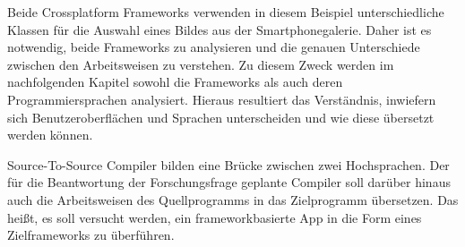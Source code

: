 



Beide Crossplatform Frameworks verwenden in diesem Beispiel unterschiedliche Klassen für die Auswahl eines Bildes aus der Smartphonegalerie.  Daher ist es notwendig,  beide Frameworks zu analysieren und die genauen Unterschiede zwischen den Arbeitsweisen zu verstehen.  Zu diesem Zweck werden im nachfolgenden Kapitel sowohl die Frameworks als auch deren Programmiersprachen analysiert.  Hieraus resultiert das Verständnis, inwiefern sich Benutzeroberflächen und Sprachen unterscheiden und wie diese übersetzt werden können.

Source-To-Source Compiler bilden eine Brücke zwischen zwei Hochsprachen.  Der für die Beantwortung der Forschungsfrage geplante Compiler soll darüber hinaus auch die Arbeitsweisen des Quellprogramms in das Zielprogramm übersetzen.  Das heißt, es soll versucht werden,  ein frameworkbasierte App in die Form eines Zielframeworks zu überführen. 




